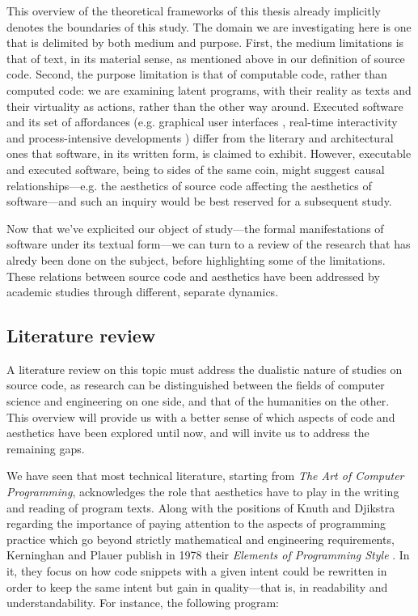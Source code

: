 This overview of the theoretical frameworks of this thesis already implicitly denotes the boundaries of this study. The domain we are investigating here is one that is delimited by both medium and purpose. First, the medium limitations is that of text, in its material sense, as mentioned above in our definition of source code. Second, the purpose limitation is that of computable code, rather than computed code: we are examining latent programs, with their reality as texts and their virtuality as actions, rather than the other way around. Executed software and its set of affordances (e.g. graphical user interfaces \citep{gelernter_machine_1998}, real-time interactivity \citep{laurel_computers_1993} and process-intensive developments \citep{murray_hamlet_1998}) differ from the literary and architectural ones that software, in its written form, is claimed to exhibit. However, executable and executed software, being to sides of the same coin, might suggest causal relationships—e.g. the aesthetics of source code affecting the aesthetics of software—and such an inquiry would be best reserved for a subsequent study.

Now that we've explicited our object of study—the formal manifestations of software under its textual form—we can turn to a review of the research that has alredy been done on the subject, before highlighting some of the limitations. These relations between source code and aesthetics have been addressed by academic studies through different, separate dynamics.

\subsection{Literature review}


A literature review on this topic must address the dualistic nature of studies on source code, as research can be distinguished between the fields of computer science and engineering on one side, and that of the humanities on the other. This overview will provide us with a better sense of which aspects of code and aesthetics have been explored until now, and will invite us to address the remaining gaps.

We have seen that most technical literature, starting from \emph{The Art of Computer Programming}, acknowledges the role that aesthetics have to play in the writing and reading of program texts. Along with the positions of Knuth and Djikstra regarding the importance of paying attention to the aspects of programming practice \citep{dijkstra_chapter_1972} which go beyond strictly mathematical and engineering requirements, Kerninghan and Plauer publish in 1978 their \emph{Elements of Programming Style} \citep{kernighan_elements_1978}. In it, they focus on how code snippets with a given intent could be rewritten in order to keep the same intent but gain in quality—that is, in readability and understandability. For instance, the following program:

